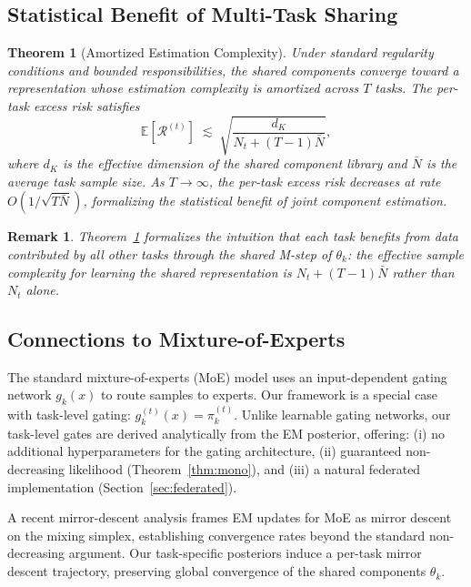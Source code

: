 \documentclass[preprint,12pt]{elsarticle}
\newtheorem{theorem}{Theorem}
\newtheorem{remark}{Remark}
\begin{document}
	\subsection{Statistical Benefit of Multi-Task Sharing}
	
	\begin{theorem}[Amortized Estimation Complexity]
		\label{thm:amortize}
		Under standard regularity conditions and bounded responsibilities,
		the shared components converge toward a representation whose
		estimation complexity is amortized across $T$ tasks. The per-task
		excess risk satisfies
		\[
		\mathbb{E}\!\left[\mathcal{R}^{(t)}\right]
		\;\lesssim\;
		\sqrt{\frac{d_K}{N_t + (T-1)\bar{N}}},
		\]
		where $d_K$ is the effective dimension of the shared component
		library and $\bar{N}$ is the average task sample size.
		As $T \to \infty$, the per-task excess risk decreases at rate
		$O(1/\sqrt{T\bar{N}})$, formalizing the statistical benefit of
		joint component estimation.
	\end{theorem}
	
	\begin{remark}
		Theorem~\ref{thm:amortize} formalizes the intuition that each task
		benefits from data contributed by all other tasks through the shared
		M-step of $\theta_k$: the effective sample complexity for learning
		the shared representation is $N_t + (T-1)\bar{N}$ rather than $N_t$
		alone.
	\end{remark}
	
	\subsection{Connections to Mixture-of-Experts}
	
	The standard mixture-of-experts (MoE) model \citep{jacobs1991adaptive}
	uses an input-dependent gating network $g_k(x)$ to route samples to
	experts. Our framework is a special case with task-level gating:
	$g_k^{(t)}(x) = \pi_k^{(t)}$. Unlike learnable gating networks, our
	task-level gates are derived analytically from the EM posterior,
	offering: (i) no additional hyperparameters for the gating
	architecture, (ii) guaranteed non-decreasing likelihood
	(Theorem~\ref{thm:mono}), and (iii) a natural federated implementation
	(Section~\ref{sec:federated}).
	
	A recent mirror-descent analysis \citep{fruytier2024learning} frames
	EM updates for MoE as mirror descent on the mixing simplex, establishing
	convergence rates beyond the standard non-decreasing argument. Our
	task-specific posteriors induce a per-task mirror descent trajectory,
	preserving global convergence of the shared components $\theta_k$.
	
\end{document}
